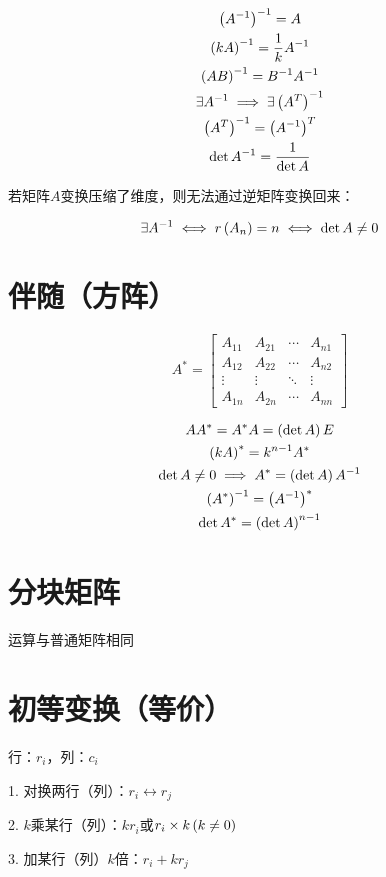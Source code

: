 \documentclass{article}
\begin{document}
\[\begin{gathered}
        \left(A^{-1}\right)^{-1}=A\\
        \left(kA\right)^{-1}=\frac1k A^{-1}\\
        \left(AB\right)^{-1}=B^{-1}A^{-1}\\
        \exists A^{-1}\implies\exists\left(A^T\right)^{-1} \\
        \left(A^T\right)^{-1}=\left(A^{-1}\right)^T\\
        \det A^{-1}=\frac1{\det A}\\
    \end{gathered}\]

若矩阵$A$变换压缩了维度，则无法通过逆矩阵变换回来：

\[\exists A^{-1}\iff r\left(A_n\right)=n\iff\det A\neq0\]

\section{伴随（方阵）}

\[A^*=\begin{bmatrix}
        A_{11} & A_{21} & \cdots & A_{n1} \\
        A_{12} & A_{22} & \cdots & A_{n2} \\
        \vdots & \vdots & \ddots & \vdots \\
        A_{1n} & A_{2n} & \cdots & A_{nn}
    \end{bmatrix}\]

\[\begin{gathered}
        AA^*=A^*A=\left(\det A\right)E\\
        \left(kA\right)^*=k^{n-1}A^*\\
        \det A\neq0\implies A^*=\left(\det A\right)A^{-1}\\
        \left(A^*\right)^{-1}=\left(A^{-1}\right)^*\\
        \det A^*=\left(\det A\right)^{n-1}
    \end{gathered}\]

\section{分块矩阵}

运算与普通矩阵相同

\section{初等变换（等价）}

\begin{definition}
    行：$r_i$，列：$c_i$

    1. 对换两行（列）：$r_i\leftrightarrow r_j$

    2. $k$乘某行（列）：$kr_i$或$r_i\times k\left(k\neq0\right)$

    3. 加某行（列）$k$倍：$r_i+kr_j$
\end{definition}
\end{document}
